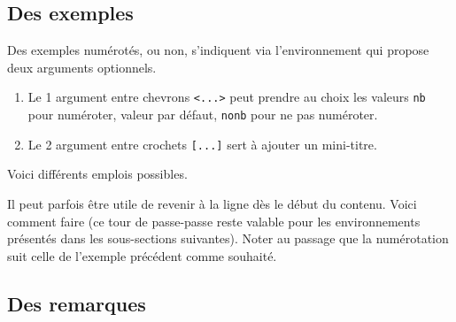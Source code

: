\documentclass[12pt, a4paper]{article}
\begin{document}


\subsection{Des exemples}

Des exemples numérotés, ou non, s'indiquent via l'environnement  qui propose deux arguments optionnels.

\begin{enumerate}
    \item Le 1\ier{} argument entre chevrons \verb#<...># peut prendre au choix les valeurs \verb#nb# pour numéroter, valeur par défaut, \verb#nonb# pour ne pas numéroter.

    \item Le 2\ieme{} argument entre crochets \verb#[...]# sert à ajouter un mini-titre.
\end{enumerate}


Voici différents emplois possibles.









\begin{bdoctip}
    Il peut parfois être utile de revenir à la ligne dès le début du contenu. Voici comment faire (ce tour de passe-passe reste valable pour les environnements présentés dans les sous-sections suivantes). Noter au passage que la numérotation suit celle de l'exemple précédent comme souhaité.

\end{bdoctip}



\subsection{Des remarques}
\end{document}
